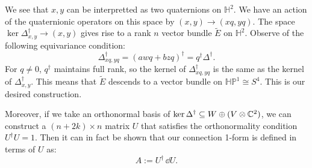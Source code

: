 	We see that $x, y$ can be interpretted as two quaternions on $\mathbb H^2$. We have an action of the quaternionic operators on this space by $(x, y) \to (x q, y q)$. The space $\ker \Delta^\dagger_{x, y} \to (x, y)$ gives rise to a rank $n$ vector bundle $\tilde E$ on $\mathbb H^2$. Observe of the following equivariance condition:
	\begin{equation}
		\Delta^\dagger_{xq, yq} = (a w q + b z q)^\dagger = q^\dagger \Delta^\dagger.
	\end{equation}
	For $q \neq 0$, $q^\dagger$ maintains full rank, so the kernel of $\Delta^\dagger_{xq, yq}$ is the same as the kernel of $\Delta^\dagger_{x,y}$. This means that $\tilde E$ descends to a vector bundle on $\mathbb{HP}^1 \cong S^4$. This is our desired construction.
	
	Moreover, if we take an orthonormal basis of $\ker \Delta^{\dagger} \subseteq W \oplus (V \otimes \mathbb{C}^2)$, we can construct a $(n+2k) \times n$ matrix $U$ that satisfies the orthonormality condition $U^\dagger U = 1$. Then it can in fact be shown that our connection 1-form is defined in terms of $U$ as:
	\[
		A := U^\dagger \, \dd U.
	\]



